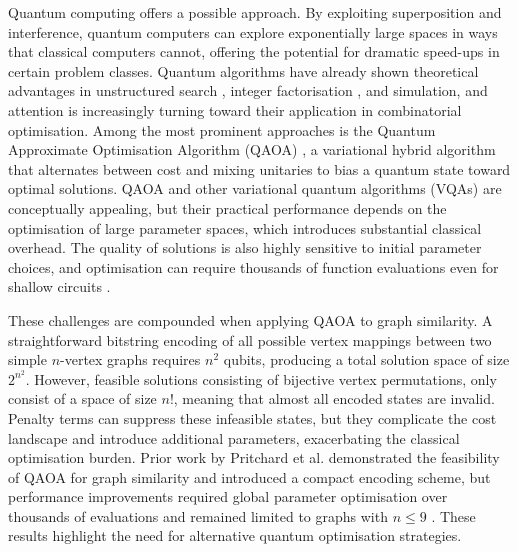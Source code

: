 Quantum computing offers a possible approach. By exploiting superposition and interference, quantum computers can explore exponentially large spaces in ways that classical computers cannot, offering the potential for dramatic speed-ups in certain problem classes. Quantum algorithms have already shown theoretical advantages in unstructured search \cite{grover_search}, integer factorisation \cite{Shor_algorithm}, and simulation, and attention is increasingly turning toward their application in combinatorial optimisation. Among the most prominent approaches is the Quantum Approximate Optimisation Algorithm (QAOA) \cite{QAOA,QAOA-review,QAOA-optimiser}, a variational hybrid algorithm that alternates between cost and mixing unitaries to bias a quantum state toward optimal solutions. QAOA and other variational quantum algorithms (VQAs) are conceptually appealing, but their practical performance depends on the optimisation of large parameter spaces, which introduces substantial classical overhead. The quality of solutions is also highly sensitive to initial parameter choices, and optimisation can require thousands of function evaluations even for shallow circuits \cite{VQAs}.

These challenges are compounded when applying QAOA to graph similarity. A straightforward bitstring encoding of all possible vertex mappings between two simple $n$-vertex graphs requires $n^2$ qubits, producing a total solution space of size $2^{n^2}$. However, feasible solutions consisting of bijective vertex permutations, only consist of a space of size $n!$, meaning that almost all encoded states are invalid. Penalty terms can suppress these infeasible states, but they complicate the cost landscape and introduce additional parameters, exacerbating the classical optimisation burden. Prior work by Pritchard et al. demonstrated the feasibility of QAOA for graph similarity and introduced a compact encoding scheme, but performance improvements required global parameter optimisation over thousands of evaluations and remained limited to graphs with $n\leq 9$ \cite{QAOA_graph_sim}. These results highlight the need for alternative quantum optimisation strategies.

